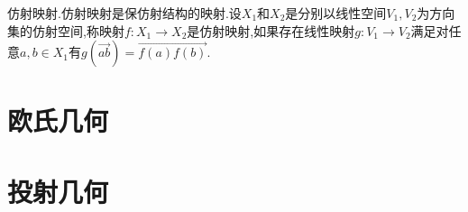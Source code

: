 仿射映射.仿射映射是保仿射结构的映射.设$X_1$和$X_2$是分别以线性空间$V_1,V_2$为方向集的仿射空间,称映射$f:X_1\to X_2$是仿射映射,如果存在线性映射$g:V_1\to V_2$满足对任意$a,b\in X_1$有$g(\overrightarrow{ab})=\overrightarrow{f(a)f(b)}$.





\section{欧氏几何}

\section{投射几何}











